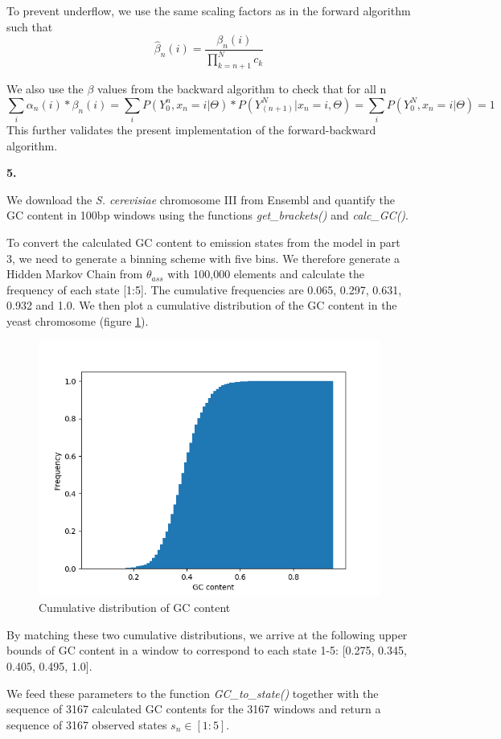 \documentclass{article}
\begin{document}
To prevent underflow, we use the same scaling factors as in the forward algorithm such that
\begin{equation}
\hat{\beta}_n(i) = \dfrac{ \beta_n(i) }{ \prod_{k=n+1}^N{c_k} }
\end{equation}

We also use the $\beta$ values from the backward algorithm to check that for all n
\begin{equation}
\sum_i{\alpha_n(i) * \beta_n(i)} = \sum_i{ P(Y_0^n, x_n = i | \Theta) * P(Y_(n+1)^N | x_n = i, \Theta) } = \sum_i{ P(Y_0^N, x_n = i | \Theta)  } = 1 
\end{equation}
 This further validates the present implementation of the forward-backward algorithm.


\textbf{\large{5.}}

We download the \textit{S. cerevisiae} chromosome III from Ensembl and quantify the GC content in 100bp windows using the functions \textit{get\_brackets()} and \textit{calc\_GC()}.

To convert the calculated GC content to emission states from the model in part 3, we need to generate a binning scheme with five bins. We therefore generate a Hidden Markov Chain from $\theta_{ass}$ with 100,000 elements and calculate the frequency of each state [1:5]. The cumulative frequencies are 0.065, 0.297, 0.631, 0.932 and 1.0.
We then plot a cumulative distribution of the GC content in the yeast chromosome (figure \ref{fig:cum}).

\begin{figure}[h]
\centering
\includegraphics[width = 0.5\linewidth, trim={0 0 0 0}, clip=true]{cumulative_GC.png}
\caption{Cumulative distribution of GC content}
\label{fig:cum}
\end{figure}

By matching these two cumulative distributions, we arrive at the following upper bounds of GC content in a window to correspond to each state 1-5: [0.275, 0.345, 0.405, 0.495, 1.0].

We feed these parameters to the function \textit{GC\_to\_state()} together with the sequence of 3167 calculated GC contents for the 3167 windows and return a sequence of 3167 observed states $s_n \in [1:5]$.
\end{document}

